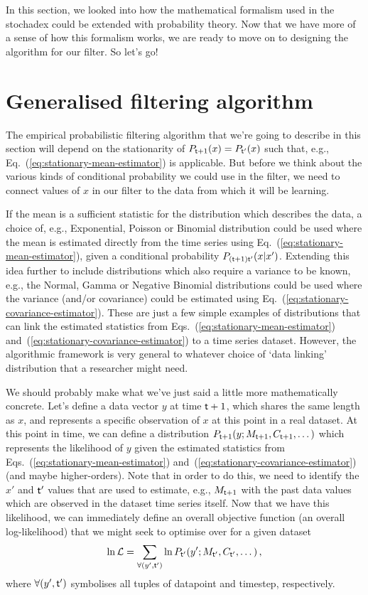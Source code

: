 In this section, we looked into how the mathematical formalism used in the stochadex could be extended with probability theory. Now that we have more of a sense of how this formalism works, we are ready to move on to designing the algorithm for our filter. So let's go!

\section{\sffamily Generalised filtering algorithm}

The empirical probabilistic filtering algorithm that we're going to describe in this section will depend on the stationarity of $P_{{\sf t}+1}(x)=P_{{\sf t}'}(x)$ such that, e.g., Eq.~(\ref{eq:stationary-mean-estimator}) is applicable. But before we think about the various kinds of conditional probability we could use in the filter, we need to connect values of $x$ in our filter to the data from which it will be learning. 

If the mean is a sufficient statistic for the distribution which describes the data, a choice of, e.g., Exponential, Poisson or Binomial distribution could be used where the mean is estimated directly from the time series using Eq.~(\ref{eq:stationary-mean-estimator}), given a conditional probability $P_{({\sf t}+1){\sf t}'}(x\vert x')$. Extending this idea further to include distributions which also require a variance to be known, e.g., the Normal, Gamma or Negative Binomial distributions could be used where the variance (and/or covariance) could be estimated using Eq.~(\ref{eq:stationary-covariance-estimator}). These are just a few simple examples of distributions that can link the estimated statistics from Eqs.~(\ref{eq:stationary-mean-estimator}) and~(\ref{eq:stationary-covariance-estimator}) to a time series dataset. However, the algorithmic framework is very general to whatever choice of `data linking' distribution that a researcher might need.

We should probably make what we've just said a little more mathematically concrete. Let's define a data vector $y$ at time ${\sf t}+1$, which shares the same length as $x$, and represents a specific observation of $x$ at this point in a real dataset. At this point in time, we can define a distribution $P_{{\sf t}+1}(y;M_{{\sf t}+1},C_{{\sf t}+1},\dots )$ which represents the likelihood of $y$ given the estimated statistics from Eqs.~(\ref{eq:stationary-mean-estimator}) and~(\ref{eq:stationary-covariance-estimator}) (and maybe higher-orders). Note that in order to do this, we need to identify the $x'$ and ${\sf t}'$ values that are used to estimate, e.g., $M_{{\sf t}+1}$ with the past data values which are observed in the dataset time series itself. Now that we have this likelihood, we can immediately define an overall objective function (an overall log-likelihood) that we might seek to optimise over for a given dataset 
\begin{align}
\ln {\cal L} = \sum_{\forall (y',{\sf t}')} \ln P_{{\sf t}'}(y';M_{{\sf t}'},C_{{\sf t}'},\dots ) \,, \label{eq:log-likelihood-filter}
\end{align}
where $\forall (y',{\sf t}')$ symbolises all tuples of datapoint and timestep, respectively. 

